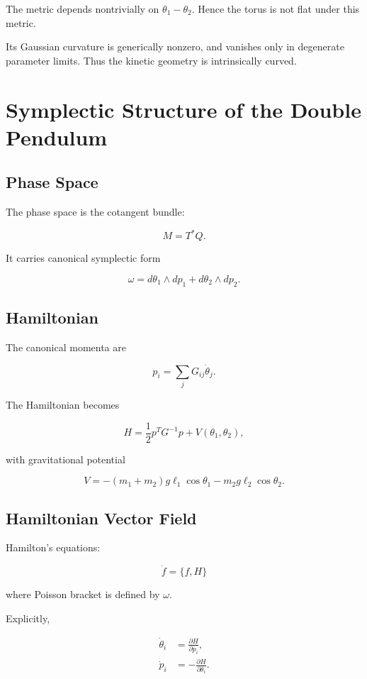 \documentclass[11pt]{book}
\begin{document}
The metric depends nontrivially on $\theta_1-\theta_2$.
Hence the torus is not flat under this metric.

Its Gaussian curvature is generically nonzero,
and vanishes only in degenerate parameter limits.
Thus the kinetic geometry is intrinsically curved.

\chapter{Symplectic Structure of the Double Pendulum}

\section{Phase Space}

The phase space is the cotangent bundle:

\[
M = T^*Q.
\]

It carries canonical symplectic form

\[
\omega = d\theta_1 \wedge dp_1 + d\theta_2 \wedge dp_2.
\]

\section{Hamiltonian}

The canonical momenta are

\[
p_i = \sum_j G_{ij} \dot\theta_j.
\]

The Hamiltonian becomes

\[
H = \frac12 p^T G^{-1} p + V(\theta_1,\theta_2),
\]

with gravitational potential

\[
V =
-(m_1+m_2)g\ell_1\cos\theta_1
- m_2 g\ell_2 \cos\theta_2.
\]

\section{Hamiltonian Vector Field}

Hamilton's equations:

\[
\dot f = \{f,H\}
\]

where Poisson bracket is defined by $\omega$.

Explicitly,

\begin{align}
\dot\theta_i &= \frac{\partial H}{\partial p_i}, \\
\dot p_i &= -\frac{\partial H}{\partial \theta_i}.
\end{align}
\end{document}
